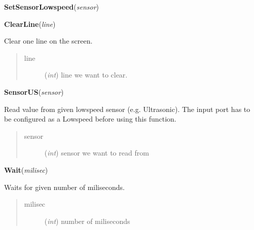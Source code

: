 \documentclass[10pt,a4paper]{article}
\begin{document}
\vspace{6pt}
{\bf SetSensorLowspeed}({\it sensor}) 

 

\vspace{6pt}
{\bf ClearLine}({\it line}) 
    
    Clear one line on the screen.
    




\begin{quote}
    \begin{description}
        
\item[line] ({\emph{int}}) line we want to clear.

    \end{description}
\end{quote}

 

\vspace{6pt}
{\bf SensorUS}({\it sensor}) 

    Read value from given lowspeed sensor (e.g. Ultrasonic). The input port 
    has to be configured as a Lowspeed before using this function.
    




\begin{quote}
    \begin{description}
        
\item[sensor] ({\emph{int}}) sensor we want to read from

    \end{description}
\end{quote}

 

\vspace{6pt}
{\bf Wait}({\it milisec}) 
    
    Waits for given number of miliseconds.





\begin{quote}
    \begin{description}
        
\item[milisec] ({\emph{int}}) number of miliseconds

    \end{description}
\end{quote}
\end{document}
